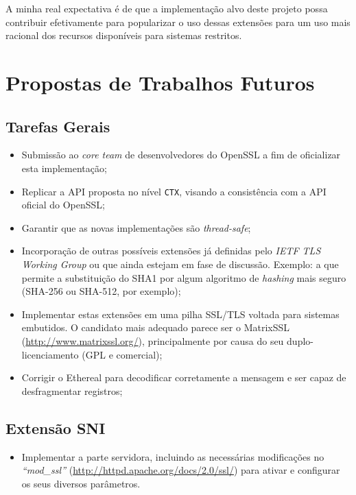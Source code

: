 A minha real expectativa é de que a implementação alvo deste projeto possa contribuir efetivamente
para popularizar o uso dessas extensões para um uso mais racional dos recursos disponíveis para
sistemas restritos.

\section{Propostas de Trabalhos Futuros}

\subsection{Tarefas Gerais}

\begin{itemize}

\item Submissão ao \emph{core team} de desenvolvedores do OpenSSL a fim de 
oficializar esta implementação;

\item Replicar a API proposta no nível \texttt{CTX}, visando a consistência com a API 
oficial do OpenSSL;

\item Garantir que as novas implementações são \emph{thread-safe};

\item Incorporação de outras possíveis extensões já definidas pelo \emph{\acs{IETF} TLS 
Working Group} ou que ainda estejam em fase de discussão. Exemplo: a que 
permite a substituição do \acs{SHA1} por algum algoritmo de \emph{hashing} mais 
seguro (SHA-256 ou SHA-512, por exemplo);

\item Implementar estas extensões em uma pilha SSL/TLS voltada para
sistemas embutidos. O candidato mais adequado parece ser o MatrixSSL (\url{http://www.matrixssl.org/}),
principalmente por causa do seu duplo-licenciamento (GPL e comercial);

\item Corrigir o Ethereal para decodificar corretamente a mensagem \tlsHsCu
e ser capaz de desfragmentar registros;

\end{itemize}

\subsection{Extensão \acl{SNI}}

\begin{itemize}

\item Implementar a parte servidora, incluindo as necessárias modificações
no \emph{``mod\_ssl''} (\url{http://httpd.apache.org/docs/2.0/ssl/}) para ativar e configurar os
seus diversos parâmetros.

\end{itemize}

